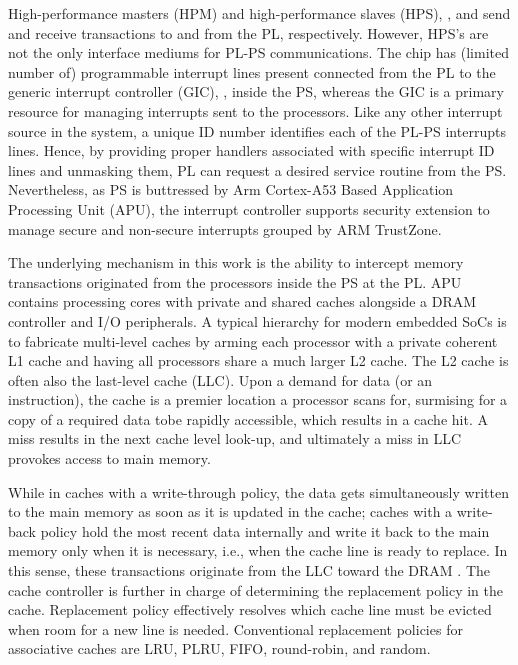  High-performance masters (HPM) and high-performance slaves (HPS), , and  send and receive transactions to and from the PL, respectively. However, HPS's are not the only interface mediums for PL-PS communications. The chip has (limited number of) programmable interrupt lines  present connected from the PL to the generic interrupt controller (GIC), , inside the PS, whereas the GIC is a primary resource for managing interrupts sent to the processors. Like any other interrupt source in the system, a unique ID number identifies each of the PL-PS interrupts lines. Hence, by providing proper handlers associated with specific interrupt ID lines and unmasking them, PL can request a desired service routine from the PS. Nevertheless, as PS is buttressed by Arm Cortex-A53 Based Application Processing Unit (APU), the interrupt controller supports security extension to manage secure and non-secure interrupts grouped by  ARM TrustZone.


    The underlying mechanism in this work is the ability to intercept memory transactions originated from the processors inside the PS at the PL. APU contains processing cores with private and shared caches alongside a DRAM controller and I/O peripherals. A typical hierarchy for modern embedded SoCs is to fabricate multi-level caches by arming each processor with a private coherent L1 cache and having all processors share a much larger L2 cache. The L2 cache is often also the last-level cache (LLC). Upon a demand for data (or an instruction), the cache is a premier location a processor scans for, surmising for a copy of a required data tobe rapidly accessible, which results in a cache hit. A miss results in the next cache level look-up, and ultimately a miss in LLC provokes access to main memory. 

While in caches with a write-through policy, the data gets simultaneously written to the main memory as soon as it is updated in the cache; caches with a write-back policy hold the most recent data internally and write it back to the main memory only when it is necessary, i.e., when the cache line is ready to replace. In this sense, these transactions originate from the LLC toward the DRAM . The cache controller is further in charge of determining the replacement policy in the cache. Replacement policy effectively resolves which cache line must be evicted when room for a new line is needed. Conventional replacement policies for associative caches are LRU, PLRU, FIFO, round-robin, and random.




